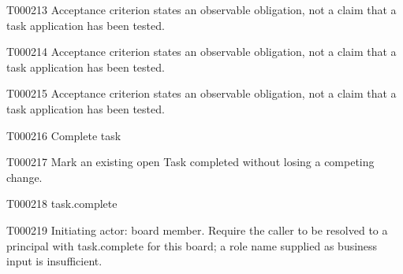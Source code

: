 \documentclass[11pt,a4paper]{article}
\begin{document}
\begin{atlasparagraph}{T000213}
Acceptance criterion states an observable obligation, not a claim that a task application has been tested.
\end{atlasparagraph}
\begin{atlasparagraph}{T000214}
Acceptance criterion states an observable obligation, not a claim that a task application has been tested.
\end{atlasparagraph}
\begin{atlasparagraph}{T000215}
Acceptance criterion states an observable obligation, not a claim that a task application has been tested.
\end{atlasparagraph}
\begin{atlastext}{T000216}
Complete task
\end{atlastext}
\begin{atlasparagraph}{T000217}
Mark an existing open Task completed without losing a competing change.
\end{atlasparagraph}
\begin{atlastext}{T000218}
task.complete
\end{atlastext}
\begin{atlasparagraph}{T000219}
Initiating actor: board member. Require the caller to be resolved to a principal with task.complete for this board; a role name supplied as business input is insufficient.
\end{atlasparagraph}
\end{document}
